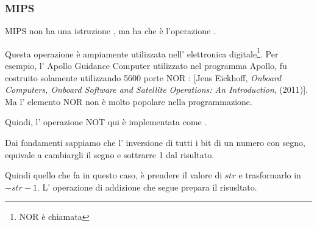 ﻿\subsubsection{MIPS}




MIPS non ha una istruzione \NOT, ma ha \NOR che è l'operazione .


Questa operazione è ampiamente utilizzata nell' elettronica digitale\footnote{NOR è chiamata }.
Per esempio, l' Apollo Guidance Computer utilizzato nel programma Apollo, 
fu costruito solamente utilizzando 5600 porte NOR :
[Jens Eickhoff, \emph{Onboard Computers, Onboard Software and Satellite Operations: An Introduction}, (2011)].
Ma l' elemento NOR non è molto popolare nella programmazione.

Quindi, l' operazione NOT qui è implementata come .

Dai fondamenti sappiamo che l' inversione di tutti i bit di un numero con segno, equivale 
a cambiargli il segno e sottrarre 1 dal risultato.

Quindi quello che \NOT fa in questo caso, è prendere il valore di $str$ e trasformarlo in $-str-1$.
L' operazione di addizione che segue prepara il risusltato.
